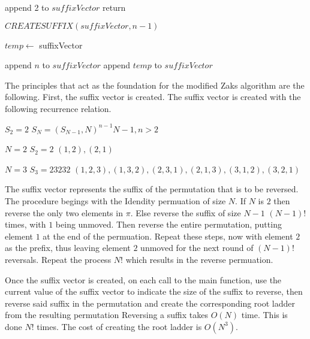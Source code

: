 \begin{algorithm}
  \begin{algorithmic}[1]
        \State append 2 to $suffixVector$
        \State return
      \EndIf

        $CREATESUFFIX(suffixVector, n-1)$
        
        $temp \gets$ suffixVector

          \State append $n$ to $suffixVector$
          \State append $temp$ to $suffixVector$
        \EndFor
    \EndFunction
  \end{algorithmic}
\end{algorithm}\pagebreak

The principles that act as the foundation for the modified Zaks 
algorithm are the following. First, the suffix vector is created. 
The suffix vector is created with the following recurrence relation.
\begin{center}
  $S_{2} = 2$\newline
  $S_{N} = (S_{N-1},N)^{n-1}N-1, n>2$\newline
\end{center}

\begin{example}
  \begin{center}


  $N=2$\newline
  $S_{2} = 2$\newline
  $(1,2), (2,1)$\newline

  $N=3$\newline
  $S_{3} = 23232$\newline 
  $(1,2,3), (1,3,2), (2,3,1), (2,1,3), (3,1,2), (3,2,1)$\newline
  \end{center}
\end{example}
The suffix vector represents the suffix of the permutation that is to 
be reversed. The procedure begings with the Idendity permuation of 
size $N$. If $N$ is $2$ then reverse the only two elements in $\pi$.
Else reverse the suffix of size $N-1$ $(N-1)!$ times, with $1$ being unmoved.
Then reverse the entire permutation, putting element $1$ at the end of the permuation.
Repeat these steps, now with element $2$ as the prefix, thus leaving element 
$2$ unmoved for the next round of $(N-1)!$ reversals. Repeat the process 
$N!$ which results in the reverse permuation.\par 
Once the suffix vector is created, on each call to the main function, use 
the current value of the suffix vector to indicate the size of the suffix to 
reverse, then reverse said suffix in the permutation and create the corresponding root ladder 
from the resulting permutation Reversing a suffix takes $O(N)$ time. This is done $N!$ times.
The cost of creating the root ladder is $O(N^{3})$.



